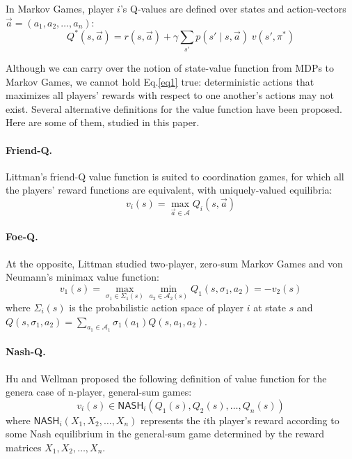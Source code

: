 \documentclass{article}
\begin{document}
    In Markov Games, player $i$'s Q-values are defined over states and action-vectors $\vec{a} = (a_{1}, a_{2}, \ldots, a_{n})$:
    \begin{equation}
        Q^{*}(s, \vec{a}) = r(s, \vec{a}) + \gamma \sum_{s'} p(s' \; | \; s, \vec{a}) \; v(s', \pi^{*})
    \end{equation}

    Although we can carry over the notion of state-value function from MDPs to Markov Games, we cannot hold Eq.\ref{eq1} true: deterministic actions that maximizes all players' rewards with respect to one another's actions may not exist.
    Several alternative definitions for the value function have been proposed.
    Here are some of them, studied in this paper.

    \paragraph{Friend-Q.}
    Littman's friend-Q value function is suited to coordination games, for which all the players' reward functions are equivalent, with uniquely-valued equilibria:
    \begin{equation}
        v_{i}(s) = \max_{\vec{a} \in \mathcal{A}} Q_{i}(s, \vec{a}) \label{eq2}
    \end{equation}

    \paragraph{Foe-Q.}
    At the opposite, Littman studied two-player, zero-sum Markov Games and von Neumann's minimax value function:
    \begin{equation}
        v_{1}(s) = \max_{\sigma_{1} \in \Sigma_{1}(s)} \min_{a_{2} \in \mathcal{A}_{2}(s)} Q_{1}(s, \sigma_{1}, a_{2}) = -v_{2}(s)
    \end{equation}
    where $\Sigma_{i}(s)$ is the probabilistic action space of player $i$ at state $s$ and $Q(s, \sigma_{1}, a_{2}) = \sum_{a_{1} \in \mathcal{A}_{1}} \sigma_{1}(a_{1}) Q(s, a_{1}, a_{2})$.

    \paragraph{Nash-Q.}
    Hu and Wellman proposed the following definition of value function for the genera case of n-player, general-sum games:
    \begin{equation}
        v_{i}(s) \in \mathsf{NASH}_{i}(Q_{1}(s), Q_{2}(s), \ldots, Q_{n}(s))
    \end{equation}
    where $\mathsf{NASH}_{i}(X_{1}, X_{2}, \ldots, X_{n})$ represents the $i$th player's reward according to some Nash equilibrium in the general-sum game determined by the reward matrices $X_{1}, X_{2}, \ldots, X_{n}$.
\end{document}
